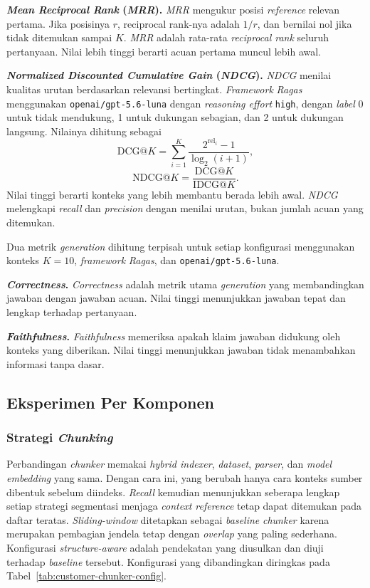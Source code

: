 \noindent\textbf{\emph{Mean Reciprocal Rank} (\emph{MRR}).}\quad
\emph{MRR} mengukur posisi \emph{reference} relevan pertama. Jika posisinya \(r\), reciprocal rank-nya
adalah \(1/r\), dan bernilai nol jika tidak ditemukan sampai \(K\). \emph{MRR} adalah rata-rata
\emph{reciprocal rank} seluruh pertanyaan. Nilai lebih tinggi berarti acuan pertama muncul lebih awal.

\noindent\textbf{\emph{Normalized Discounted Cumulative Gain} (\emph{NDCG}).}\quad
\emph{NDCG} menilai kualitas urutan berdasarkan relevansi bertingkat. \emph{Framework} \emph{Ragas}
menggunakan \texttt{openai/gpt-5.6-luna} dengan \emph{reasoning effort} \texttt{high}, dengan \emph{label}
0 untuk tidak mendukung, 1 untuk dukungan sebagian, dan 2 untuk dukungan langsung. Nilainya
dihitung sebagai
\[
\mathrm{DCG}@K=\sum_{i=1}^{K}\frac{2^{\mathrm{rel}_i}-1}{\log_2(i+1)},
\]
\[
\mathrm{NDCG}@K=\frac{\mathrm{DCG}@K}{\mathrm{IDCG}@K}.
\]
Nilai tinggi berarti konteks yang lebih membantu berada lebih awal. \emph{NDCG} melengkapi \emph{recall}
dan \emph{precision} dengan menilai urutan, bukan jumlah acuan yang ditemukan.

Dua metrik \emph{generation} dihitung terpisah untuk setiap konfigurasi menggunakan konteks
\(K = 10\), \emph{framework} \emph{Ragas}, dan \texttt{openai/gpt-5.6-luna}.

\noindent\textbf{\emph{Correctness}.}\quad
\emph{Correctness} adalah metrik utama \emph{generation} yang membandingkan jawaban dengan jawaban acuan.
Nilai tinggi menunjukkan jawaban tepat dan lengkap terhadap pertanyaan.

\noindent\textbf{\emph{Faithfulness}.}\quad
\emph{Faithfulness} memeriksa apakah klaim jawaban didukung oleh konteks yang diberikan. Nilai tinggi
menunjukkan jawaban tidak menambahkan informasi tanpa dasar.

\subsection{Eksperimen Per Komponen}
\label{subsec:user-manual-experiment-components}

\subsubsection{Strategi \emph{Chunking}}
\label{subsubsec:user-manual-chunking}

Perbandingan \emph{chunker} memakai \emph{hybrid indexer}, \emph{dataset}, \emph{parser}, dan \emph{model}
\emph{embedding} yang sama. Dengan cara ini, yang berubah hanya cara konteks sumber dibentuk sebelum
diindeks. \emph{Recall} kemudian menunjukkan seberapa lengkap setiap strategi segmentasi menjaga
\emph{context reference} tetap dapat ditemukan pada daftar teratas. \emph{Sliding-window} ditetapkan
sebagai \emph{baseline} \emph{chunker} karena merupakan pembagian jendela tetap dengan \emph{overlap} yang paling
sederhana. Konfigurasi \emph{structure-aware} adalah pendekatan yang diusulkan dan diuji terhadap
\emph{baseline} tersebut. Konfigurasi yang dibandingkan
diringkas pada Tabel~\ref{tab:customer-chunker-config}.

